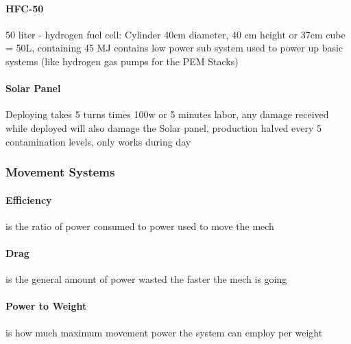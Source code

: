 \paragraph {HFC-50} 50 liter - hydrogen fuel cell: Cylinder 40cm diameter,
40 cm height or 37cm cube = 50L, containing 45 MJ
contains low power sub system
used to power up basic systems (like hydrogen gas pumps for the PEM Stacks)

\paragraph {Solar Panel} Deploying takes 5 turns times 100w or 5 minutes labor, any damage received while deployed
will also damage the Solar panel, production halved every 5 contamination levels, only works during day

\subsubsection{Movement Systems}\label{sec:movementsystems}
\paragraph{Efficiency} is the ratio of power consumed to power used to move the mech
\paragraph{Drag} is the general amount of power wasted the faster the mech is going
\paragraph{Power to Weight} is how much maximum movement power the system can employ per weight

